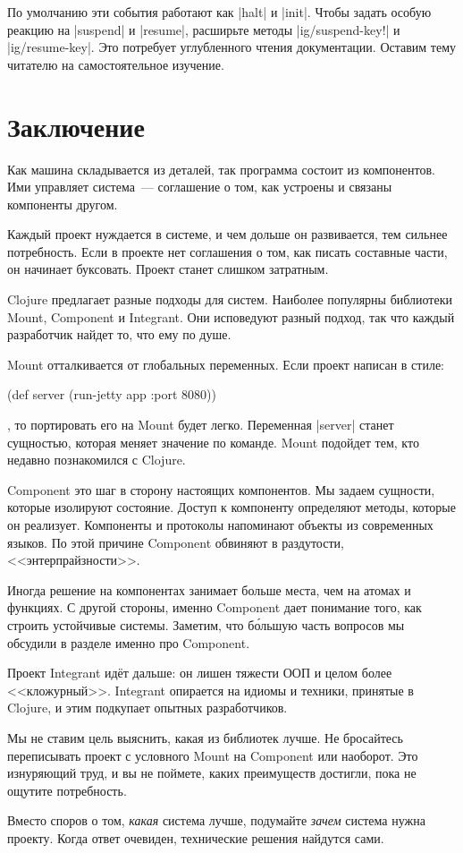 По умолчанию эти события работают как \spverb|halt| и \spverb|init|. Чтобы
задать особую реакцию на \spverb|suspend| и \spverb|resume|, расширьте методы
\spverb|ig/suspend-key!| и \spverb|ig/resume-key|. Это потребует углубленного
чтения документации. Оставим тему читателю на самостоятельное изучение.

\section{Заключение}

Как машина складывается из деталей, так программа состоит из компонентов. Ими
управляет система~--- соглашение о том, как устроены и связаны компоненты
другом.

Каждый проект нуждается в системе, и чем дольше он развивается, тем сильнее
потребность. Если в проекте нет соглашения о том, как писать составные части, он
начинает буксовать. Проект станет слишком затратным.

Clojure предлагает разные подходы для систем. Наиболее популярны библиотеки
Mount, Component и Integrant. Они исповедуют разный подход, так что каждый
разработчик найдет то, что ему по душе.

Mount отталкивается от глобальных переменных. Если проект написан в стиле:

\begin{english}
  \begin{clojure}
(def server (run-jetty app {:port 8080}))
  \end{clojure}
\end{english}

\noindent
, то портировать его на Mount будет легко. Переменная \spverb|server| станет
сущностью, которая меняет значение по команде. Mount подойдет тем, кто недавно
познакомился с Clojure.

Component это шаг в сторону настоящих компонентов. Мы задаем сущности, которые
изолируют состояние. Доступ к компоненту определяют методы, которые он
реализует. Компоненты и протоколы напоминают объекты из современных языков. По
этой причине Component обвиняют в раздутости, <<энтерпрайзности>>.

Иногда решение на компонентах занимает больше места, чем на атомах и функциях. С
другой стороны, именно Component дает понимание того, как строить устойчивые
системы. Заметим, что б\'{о}льшую часть вопросов мы обсудили в разделе именно
про Component.

Проект Integrant ид\"{е}т дальше: он лишен тяжести ООП и целом более
<<кложурный>>. Integrant опирается на идиомы и техники, принятые в Clojure, и
этим подкупает опытных разработчиков.

Мы не ставим цель выяснить, какая из библиотек лучше. Не бросайтесь переписывать
проект с условного Mount на Component или наоборот. Это изнуряющий труд, и вы не
поймете, каких преимуществ достигли, пока не ощутите потребность.

Вместо споров о том, \emph{какая} система лучше, подумайте \emph{зачем} система
нужна проекту. Когда ответ очевиден, технические решения найдутся сами.
